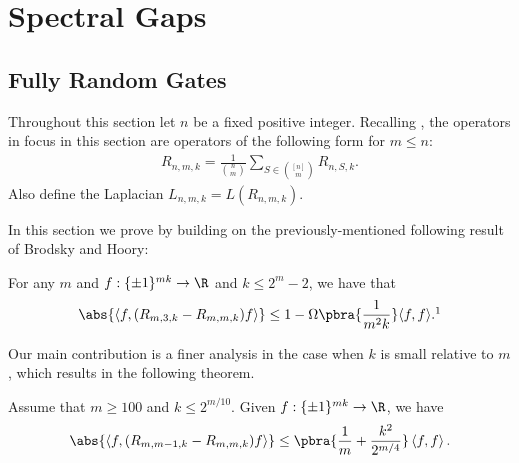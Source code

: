 

\section{Spectral Gaps}\label{sec:spectral gaps}



\subsection{Fully Random Gates}
Throughout this section let $n$ be a fixed positive integer. Recalling , the operators in focus in this section are operators of the following form for $m\leq n$:
\begin{align*}
    R_{n,m,k}=\frac1{\binom{n}{m}}\sum_{S\in \binom{[n]}{m}}R_{n,S,k}.
\end{align*}
Also define the Laplacian $L_{n,m,k}=L(R_{n,m,k})$.

In this section we prove  by building on the previously-mentioned following result of Brodsky and Hoory:

\begin{theorem}\label{Brodsky-Hoory}
    For any $m$ and $f:\{\pm1\}^{mk}\to\R$ and $k\leq 2^m-2$, we have that
    \begin{align*}
       \abs{ \left\langle f,(R_{m,3,k}-R_{m,m,k})f\right\rangle }\leq 1-\Omega\pbra{\frac1{m^2k}}\langle f,f\rangle.\footnotemark
    \end{align*}
\end{theorem}
Our main contribution is a finer analysis in the case when $k$ is small relative to $m$, which results in the following theorem.

\begin{theorem}\label{thm:small k}
    Assume that $m\geq100$ and $k\leq 2^{m/10}$. Given $f:\{\pm1\}^{mk}\to\R$, we have 
    \begin{align*}
       \abs{ \left\langle f,(R_{m,m-1,k}-R_{m,m,k})f\right\rangle }\leq  \pbra{\frac1m+\frac{k^2}{2^{m/4}}}\left\langle f,f\right\rangle.
    \end{align*}
\end{theorem}

